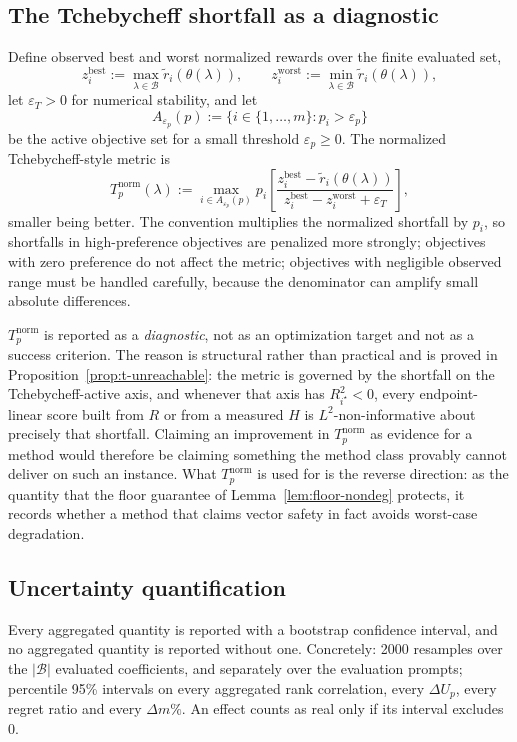 \documentclass[12pt,a4paper]{report}
\newcommand{\1}{\mathbf{1}}
\newcommand{\Bset}{\mathcal{B}}
\theoremstyle{definition}
\begin{document}
\subsection{The Tchebycheff shortfall as a diagnostic}
\label{sec:tchebycheff}

Define observed best and worst normalized rewards over the finite evaluated set,
\[
z_i^{\mathrm{best}}:=\max_{\lambda\in\Bset}\tilde r_i(\theta(\lambda)),
\qquad
z_i^{\mathrm{worst}}:=\min_{\lambda\in\Bset}\tilde r_i(\theta(\lambda)),
\]
let \(\varepsilon_T>0\) for numerical stability, and let
\[
A_{\varepsilon_p}(p):=\{i\in\{1,\dots,m\}:p_i>\varepsilon_p\}
\]
be the active objective set for a small threshold \(\varepsilon_p\ge0\). The normalized Tchebycheff-style metric is
\[
T_p^{\mathrm{norm}}(\lambda):=\max_{i\in A_{\varepsilon_p}(p)}
p_i\left[\frac{z_i^{\mathrm{best}}-\tilde r_i(\theta(\lambda))}{z_i^{\mathrm{best}}-z_i^{\mathrm{worst}}+\varepsilon_T}\right],
\]
smaller being better. The convention multiplies the normalized shortfall by \(p_i\), so shortfalls in high-preference objectives are penalized more strongly; objectives with zero preference do not affect the metric; objectives with negligible observed range must be handled carefully, because the denominator can amplify small absolute differences.

\(T_p^{\mathrm{norm}}\) is reported as a \emph{diagnostic}, not as an optimization target and not as a success criterion. The reason is structural rather than practical and is proved in Proposition~\ref{prop:t-unreachable}: the metric is governed by the shortfall on the Tchebycheff-active axis, and whenever that axis has \(R^2_{i^\star}<0\), every endpoint-linear score built from \(R\) or from a measured \(H\) is \(L^2\)-non-informative about precisely that shortfall. Claiming an improvement in \(T_p^{\mathrm{norm}}\) as evidence for a method would therefore be claiming something the method class provably cannot deliver on such an instance. What \(T_p^{\mathrm{norm}}\) is used for is the reverse direction: as the quantity that the floor guarantee of Lemma~\ref{lem:floor-nondeg} protects, it records whether a method that claims vector safety in fact avoids worst-case degradation.

\subsection{Uncertainty quantification}
\label{sec:uncertainty}

Every aggregated quantity is reported with a bootstrap confidence interval, and no aggregated quantity is reported without one. Concretely: 2000 resamples over the \(\lvert\Bset\rvert\) evaluated coefficients, and separately over the evaluation prompts; percentile 95\% intervals on every aggregated rank correlation, every \(\Delta U_p\), every regret ratio and every \(\Delta m\%\). An effect counts as real only if its interval excludes \(0\).
\end{document}
